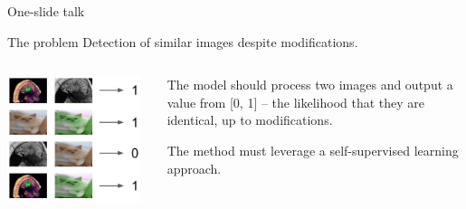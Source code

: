 \documentclass{beamer}
\begin{document}
\begin{frame}{One-slide talk}
\begin{block}{The problem}
Detection of similar images despite modifications.
\end{block}

\medskip

\begin{columns}
    \begin{column}{0.42\textwidth}
        \includegraphics[width=0.95\textwidth]{fig/model-eval.png}
    \end{column}
    \begin{column}{0.58\textwidth}
        The model should process two images and output a value from [0, 1] --
        the likelihood that they are identical, up to modifications.
        
        \bigskip
        The method must leverage a self-supervised learning approach.
    \end{column}
\end{columns}
\end{frame}

\end{document}
